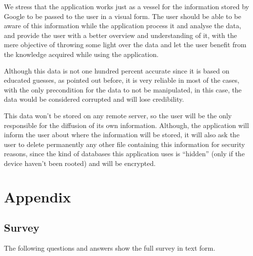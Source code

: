 \documentclass[12p]{article}
\begin{document}
We stress that the application works just as a vessel for the information stored by Google to be passed to the user in a visual form.
The user should be able to be aware of this information while the application process it and analyse the data, and provide the user with a better overview and understanding of it, with the mere objective of throwing some light over the data and let the user benefit from the knowledge acquired while using the application.

Although this data is not one hundred percent accurate since it is based on educated guesses, as pointed out before, it is very reliable in most of the cases, with the only precondition for the data to not be manipulated, in this case, the data would be considered corrupted and will lose credibility.

This data won’t be stored on any remote server, so the user will be the only responsible for the diffusion of its own information. Although, the application will inform the user about where the information will be stored, it will also ask the user to delete permanently any other file containing this information for security reasons, since the kind of databases this application uses is “hidden” (only if the device haven’t been rooted) and will be encrypted.


\newpage
\printbibliography[heading=bibintoc,title={References}]


\newpage
\appendix

\section{Appendix}

\subsection{Survey} \label{FullSurvey}

The following questions and answers show the full survey in text form.
\end{document}
